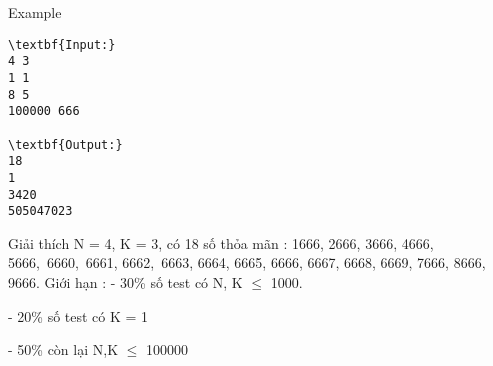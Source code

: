 Example
\begin{verbatim}
\textbf{Input:}
4 3
1 1
8 5
100000 666

\textbf{Output:}
18
1
3420
505047023
\end{verbatim}
Giải thích
N = 4, K = 3, có 18 số thỏa mãn : 1666, 2666, 3666, 4666, 5666, 6660, 6661, 6662, 6663, 6664, 6665, 6666, 6667, 6668, 6669, 7666, 8666, 9666.
Giới hạn :
- 30\% số test có N, K  $\le$  1000.

- 20\% số test có K = 1

- 50\% còn lại N,K  $\le$  100000 